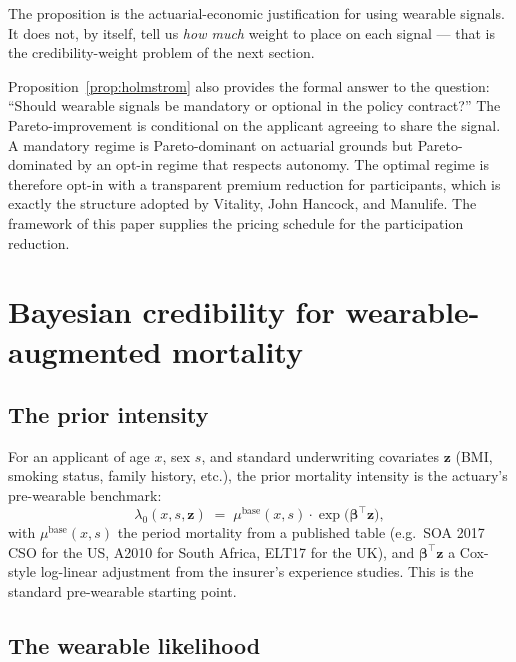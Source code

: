 \documentclass[11pt,a4paper]{article}
\let\origsection\section
\renewcommand{\section}{\clearpage\origsection}
\theoremstyle{ia}
\newcommand{\1}{\mathbf{1}}
\begin{document}
The proposition is the actuarial-economic justification for using
wearable signals. It does not, by itself, tell us \emph{how much}
weight to place on each signal --- that is the credibility-weight
problem of the next section.

\begin{nbox}
Proposition~\ref{prop:holmstrom} also provides the formal answer to
the question: ``Should wearable signals be mandatory or optional in
the policy contract?'' The Pareto-improvement is conditional on the
applicant agreeing to share the signal. A mandatory regime is
Pareto-dominant on actuarial grounds but Pareto-dominated by an
opt-in regime that respects autonomy. The optimal regime is therefore
opt-in with a transparent premium reduction for participants, which
is exactly the structure adopted by Vitality, John Hancock, and
Manulife. The framework of this paper supplies the pricing schedule
for the participation reduction.
\end{nbox}

\section{Bayesian credibility for wearable-augmented mortality}\label{sec:credibility}

\subsection{The prior intensity}\label{ss:prior}

For an applicant of age $x$, sex $s$, and standard underwriting
covariates $\mathbf{z}$ (BMI, smoking status, family history, etc.),
the prior mortality intensity is the actuary's pre-wearable
benchmark:
\begin{equation}\label{eq:prior}
   \lambda_0(x,s,\mathbf{z}) \;=\;
   \mu^{\mathrm{base}}(x,s) \cdot \exp\!\bigl(\bm{\beta}^\top \mathbf{z}\bigr),
\end{equation}
with $\mu^{\mathrm{base}}(x,s)$ the period mortality from a published
table (e.g.\ SOA 2017 CSO for the US, A2010 for South Africa, ELT17
for the UK), and $\bm{\beta}^\top\mathbf{z}$ a Cox-style log-linear
adjustment from the insurer's experience studies. This is the
standard pre-wearable starting point.

\subsection{The wearable likelihood}\label{ss:lik}
\end{document}
